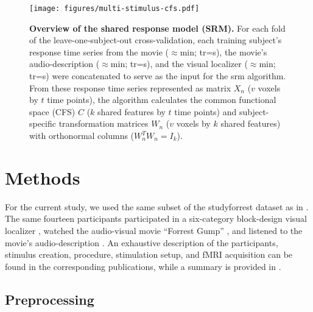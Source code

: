 \begin{figure*}[tbp]
\centering
\texttt{[image: figures/multi-stimulus-cfs.pdf]}
\caption{
%
    \textbf{Overview of the shared response model (SRM).
}
    For each fold of the leave-one-subject-out cross-validation, each training
    subject's response time series from
    the movie ($\approx$\unit[120]{min}; \acf{tr}=\unit[2]{s}),
    the movie's audio-description ($\approx$\unit[120]{min};
    \ac{tr}=\unit[2]{s}),
    and the visual localizer ($\approx$\unit[20]{min}; \ac{tr}=\unit[2]{s})
    were concatenated to serve as the input for the \ac{srm} algorithm.
    From these response time series represented as matrix $X_{n}$ ({$v$} voxels
    by $t$ time points), the algorithm calculates the common functional
    space (CFS) $C$ ($k$ shared features by $t$ time points) and
    subject-specific transformation matrices $W_{n}$
    ($v$ voxels by $k$ shared features) with orthonormal columns
    ($W_{n}^{T}W_{n}=I_{k}$).
} \label{fig:multi-stimulus-cfs} \end{figure*}


\section{Methods}


For the current study, we used the same subset of the studyforrest dataset as in
\citet{haeusler2022processing}.
%
The same fourteen participants
participated in a six-category block-design visual localizer
\citep{sengupta2016extension},
watched the audio-visual movie ``Forrest Gump'' \citep{hanke2016simultaneous},
and
listened to the movie's audio-description \citep{hanke2014audiomovie}.
An exhaustive description of the participants, stimulus creation, procedure,
stimulation setup, and fMRI acquisition can be found in the corresponding
publications, while a summary is provided in \citet{haeusler2022processing}.



\subsection{Preprocessing}

